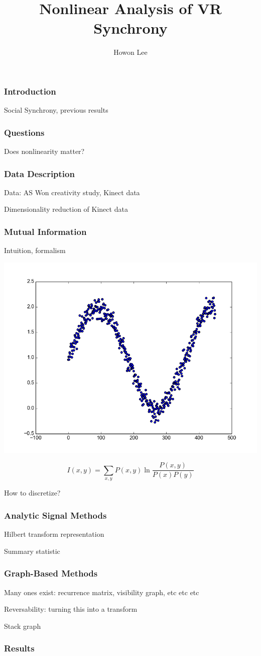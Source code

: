 \documentclass{beamer}
\begin{document}
\title{Nonlinear Analysis of VR Synchrony}
\author{Howon Lee}
\maketitle

\begin{frame}
  \frametitle{Introduction}
  Social Synchrony, previous results
\end{frame}
\begin{frame}
  \frametitle{Questions}
  Does nonlinearity matter?
\end{frame}
\begin{frame}
  \frametitle{Data Description}
  Data: AS Won creativity study, Kinect data

  Dimensionality reduction of Kinect data
\end{frame}
\begin{frame}
  \frametitle{Mutual Information}
  Intuition, formalism

  \includegraphics[scale=0.2]{mi_ex}
  
  $$I(x,y) = \sum_{x,y}P(x,y) \ln \frac{P(x,y)}{P(x)P(y)}$$

  How to discretize?
\end{frame}
\begin{frame}
  \frametitle{Analytic Signal Methods}
  Hilbert transform representation %

  Summary statistic %
\end{frame}
\begin{frame}
  \frametitle{Graph-Based Methods}
  Many ones exist: recurrence matrix, visibility graph, etc etc etc

  Reversability: turning this into a transform

  Stack graph
\end{frame}
\begin{frame}
  \frametitle{Results}
\end{frame}
\end{document}
